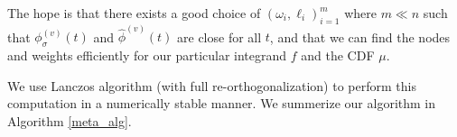 \documentclass[conference]{IEEEtran}
\newcommand{\R}{\mathbb{R}}
\newcommand{\phis}{\phi_{\sigma}}
\newcommand{\phisv}{\phis^{(v)}}
\DeclareMathOperator{\1}{\mathbf{1}}
\theoremstyle{definition}
\newtheorem{theorem}{Theorem}
\begin{document}
The hope is that there exists a good choice of $(\omega_i, \ell_i)_{i=1}^m$ where $m \ll n$ such that $\phisv(t)$ and $\widehat{\phi}^{(v)}(t)$ are close for all $t$, and that we can find the nodes and weights efficiently for our particular integrand $f$ and the CDF $\mu$. 


     We use Lanczos algorithm (with full re-orthogonalization) to perform this computation in a numerically stable manner. We summerize our algorithm in Algorithm \ref{meta_alg}.
\end{document}
